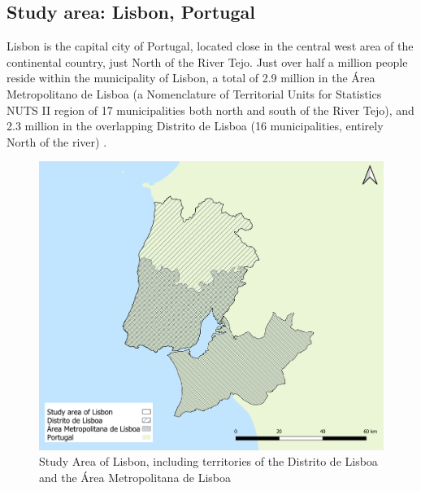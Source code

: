\subsection{Study area: Lisbon, Portugal}
Lisbon is the capital city of Portugal, located close in the central west area of the continental country, just North of the River Tejo. Just over half a million people reside within the municipality of Lisbon, a total of 2.9 million in the Área Metropolitano de Lisboa (a Nomenclature of Territorial Units for Statistics NUTS II region \cite{eurostat} of 17 municipalities both north and south of the River Tejo), and 2.3 million in the overlapping Distrito de Lisboa (16 municipalities, entirely North of the river) \cite{censos2021}.

\begin{figure}[H]
	\centering
	\includegraphics[width=.9\linewidth]{images/study_area.png}
	\caption{Study Area of Lisbon, including territories of the Distrito de Lisboa and the Área Metropolitana de Lisboa}
	\label{fig:study_areal}
\end{figure}

